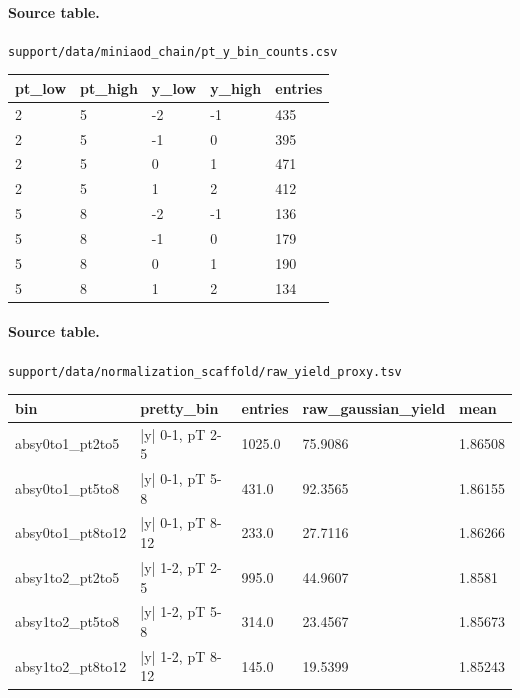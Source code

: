 \documentclass[11pt]{article}
\begin{document}
\paragraph{Source table.} \texttt{support/data/miniaod\_chain/pt\_y\_bin\_counts.csv}
\begin{center}\scriptsize
\begin{tabular}{|l|l|l|l|l|}
\hline
pt\_low & pt\_high & y\_low & y\_high & entries \\ \hline
2 & 5 & -2 & -1 & 435 \\ \hline
2 & 5 & -1 & 0 & 395 \\ \hline
2 & 5 & 0 & 1 & 471 \\ \hline
2 & 5 & 1 & 2 & 412 \\ \hline
5 & 8 & -2 & -1 & 136 \\ \hline
5 & 8 & -1 & 0 & 179 \\ \hline
5 & 8 & 0 & 1 & 190 \\ \hline
5 & 8 & 1 & 2 & 134 \\ \hline
\end{tabular}
\end{center}
\paragraph{Source table.} \texttt{support/data/normalization\_scaffold/raw\_yield\_proxy.tsv}
\begin{center}\scriptsize
\begin{tabular}{|l|l|l|l|l|}
\hline
bin & pretty\_bin & entries & raw\_gaussian\_yield & mean \\ \hline
absy0to1\_pt2to5 & |y| 0-1, pT 2-5 & 1025.0 & 75.9086 & 1.86508 \\ \hline
absy0to1\_pt5to8 & |y| 0-1, pT 5-8 & 431.0 & 92.3565 & 1.86155 \\ \hline
absy0to1\_pt8to12 & |y| 0-1, pT 8-12 & 233.0 & 27.7116 & 1.86266 \\ \hline
absy1to2\_pt2to5 & |y| 1-2, pT 2-5 & 995.0 & 44.9607 & 1.8581 \\ \hline
absy1to2\_pt5to8 & |y| 1-2, pT 5-8 & 314.0 & 23.4567 & 1.85673 \\ \hline
absy1to2\_pt8to12 & |y| 1-2, pT 8-12 & 145.0 & 19.5399 & 1.85243 \\ \hline
\end{tabular}
\end{center}
\end{document}
